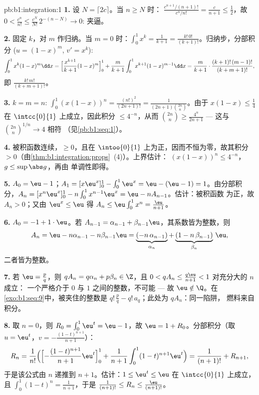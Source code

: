 \begin{solution}{pb:b1:integration:1}
\textbf{1.} 设 $N = \lceil 2c \rceil$。当 $n \geq N$ 时：
$\frac{c^{n+1}/(n+1)!}{c^n/n!} = \frac{c}{n+1} \leq \frac12$，故
$0 < \frac{c^n}{n!} \leq \frac{c^N}{N!}\,2^{-(n - N)} \to 0$:
夹逼。

\textbf{2.} 固定 $k$，对 $m$ 作归纳。当 $m = 0$ 时：$\int_0^1
x^k = \frac{1}{k+1} = \frac{k!\,0!}{(k+1)!}$。归纳步，分部积分
($u = (1-x)^m$, $v' = x^k$):
\[
\int_0^1 x^k (1-x)^m \dd x
= \Bigl[\frac{x^{k+1}}{k+1}(1-x)^m\Bigr]_0^1
+ \frac{m}{k+1}\int_0^1 x^{k+1}(1-x)^{m-1}\dd x
= \frac{m}{k+1}\cdot\frac{(k+1)!\,(m-1)!}{(k+m+1)!} ,
\]
即 $\frac{k!\,m!}{(k+m+1)!}$。

\textbf{3.} $k = m = n$: $\int_0^1 (x(1-x))^n =
\frac{(n!)^2}{(2n+1)!} = \frac{1}{(2n+1)\binom{2n}{n}}$。由于
$x(1-x) \leq \frac14$ 在 $\intcc{0}{1}$ 上成立，因此积分 $\leq
4^{-n}$，从而 $\binom{2n}{n} \geq \frac{4^n}{2n+1}$ ---
这与 $\binom{2n}{n}^{1/n} \to 4$ 相符
（见\cref{pb:b1:seq:1}）。

\textbf{4.} 被积函数连续，$\geq 0$，且在
$\intoo{0}{1}$ 上为正，因而不恒为零，故其积分
$> 0$（由\cref{thm:b1:integration:props}~(4)）。上界估计：
$(x(1-x))^n \leq 4^{-n}$，$g \leq \sup\abs g$，再由
单调性即得。

\textbf{5.} $A_0 = \eu - 1$；$A_1 = [x\eu^x]_0^1 - \int_0^1
\eu^x = \eu - (\eu - 1) = 1$。由分部积分，$A_n = [x^n \eu^x]_0^1 -
n\int_0^1 x^{n-1}\eu^x = \eu - n A_{n-1}$。估计：被积函数
为正，故 $A_n > 0$；又由 $\eu^x \leq \eu$ 得 $A_n \leq
\eu\int_0^1 x^n = \frac{\eu}{n+1}$。

\textbf{6.} $A_0 = -1 + 1\cdot\eu$。若 $A_{n-1} = \alpha_{n-1} +
\beta_{n-1}\eu$，其系数皆为整数，则
\[
A_n = \eu - n\alpha_{n-1} - n\beta_{n-1}\eu
= \underbrace{(-n\,\alpha_{n-1})}_{\alpha_n}
+ \underbrace{(1 - n\,\beta_{n-1})}_{\beta_n}\,\eu ,
\]
二者皆为整数。

\textbf{7.} 若 $\eu = \frac pq$，则 $q A_n = q\alpha_n + p\beta_n
\in \Z$，且 $0 < qA_n \leq \frac{q\eu}{n+1} < 1$ 对充分大的 $n$ 成立：
一个严格介于 $0$ 与 $1$ 之间的整数，不可能 --- 故 $\eu
\notin \Q$。在\cref{exo:b1:seq:9}中，被夹住的整数是
$q!\,\frac pq - q!\,a_q$；此处为 $qA_n$：同一陷阱，
燃料来自积分。

\textbf{8.} 取 $n = 0$，则 $R_0 = \int_0^1 \eu^t = \eu - 1$，故 $\eu =
1 + R_0$。分部积分（取 $u = \eu^t$，$v = -\frac{(1-t)^{n+1}}{n+1}$）：
\[
R_n = \frac{1}{n!}\Bigl(\Bigl[-\frac{(1-t)^{n+1}}{n+1}
\eu^t\Bigr]_0^1 + \frac{1}{n+1}\int_0^1 (1-t)^{n+1}\eu^t\Bigr)
= \frac{1}{(n+1)!} + R_{n+1} ,
\]
于是该公式由 $n$ 递推到 $n + 1$。估计：$1 \leq
\eu^t \leq \eu$ 在 $\intcc{0}{1}$ 上成立，且 $\int_0^1 (1-t)^n =
\frac{1}{n+1}$，于是 $\frac{1}{(n+1)!} \leq R_n \leq
\frac{\eu}{(n+1)!}$。


\end{solution}
